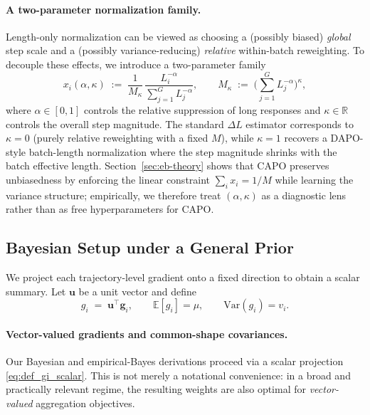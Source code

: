 \paragraph{A two-parameter normalization family.}
Length-only normalization can be viewed as choosing a (possibly biased) \emph{global} step scale and a (possibly variance-reducing) \emph{relative} within-batch reweighting. To decouple these effects, we introduce a two-parameter family
\begin{equation}
  x_i(\alpha,\kappa)
  \;:=\;
  \frac{1}{M_\kappa}\,\frac{L_i^{-\alpha}}{\sum_{j=1}^{G} L_j^{-\alpha}},
  \qquad
  M_\kappa\;:=\;\Big(\sum_{j=1}^{G} L_j^{-\alpha}\Big)^{\kappa},
  \label{eq:two_param_norm}
\end{equation}
where $\alpha\in[0,1]$ controls the relative suppression of long responses and $\kappa\in\mathbb{R}$ controls the overall step magnitude. The standard $\Delta L$ estimator corresponds to $\kappa=0$ (purely relative reweighting with a fixed $M$), while $\kappa=1$ recovers a DAPO-style batch-length normalization where the step magnitude shrinks with the batch effective length. Section~\ref{sec:eb-theory} shows that CAPO preserves unbiasedness by enforcing the linear constraint $\sum_i x_i=1/M$ while learning the variance structure; empirically, we therefore treat $(\alpha,\kappa)$ as a diagnostic lens rather than as free hyperparameters for CAPO.

\subsection{Bayesian Setup under a General Prior}\label{subsec:bayes-setup}
We project each trajectory-level gradient onto a fixed direction to obtain a scalar summary. Let $\bm{u}$ be a unit vector and define
\begin{equation}
  g_i \;=\; \bm{u}^\top \bm{g}_i,\qquad \mathbb{E}[g_i]=\mu,\qquad \mathrm{Var}(g_i)=v_i.
  \label{eq:def_gi_scalar}
\end{equation}
\paragraph{Vector-valued gradients and common-shape covariances.}
Our Bayesian and empirical-Bayes derivations proceed via a scalar projection \eqref{eq:def_gi_scalar}.
This is not merely a notational convenience: in a broad and practically relevant regime, the resulting weights are also optimal for \emph{vector-valued} aggregation objectives.

